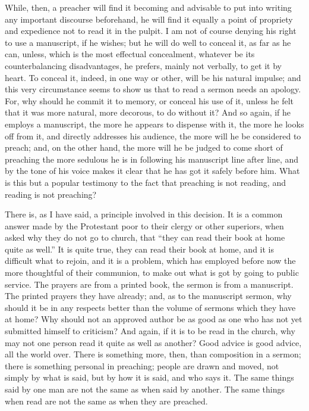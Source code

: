 While, then, a preacher will find it becoming and advisable to put
into writing any important discourse beforehand, he will find it
equally a point of propriety and expedience not to read it in the
pulpit. I am not of course denying his right to use a manuscript, if
he wishes; but he will do well to conceal it, as far as he can,
unless, which is the most effectual concealment, whatever be its
counterbalancing disadvantages, he prefers, mainly not verbally, to
get it by heart. To conceal it, indeed, in one way or other, will be
his natural impulse; and this very circumstance seems to show us that
to read a sermon needs an apology. For, why should he commit it to
memory, or conceal his use of it, unless he felt that it was more
natural, more decorous, to do without it? And so again, if he employs
a manuscript, the more he appears to dispense with it, the more he
looks off from it, and directly addresses his audience, the more will
he be considered to preach; and, on the other hand, the more will he
be judged to come short of preaching the more sedulous he is in
following his manuscript line after line, and by the tone of his voice
makes it clear that he has got it safely before him. What is this but
a popular testimony to the fact that preaching is not reading, and
reading is not preaching?

There is, as I have said, a principle involved in this decision. It
is a common answer made by the Protestant poor to their clergy or
other superiors, when asked why they do not go to church, that
``they can read their book at home quite as well.'' It is
quite true, they can read their book at home, and it is difficult what
to rejoin, and it is a problem, which has employed before now the more
thoughtful of their communion, to make out what is got by going to
public service. The prayers are from a printed book, the sermon is
from a manuscript. The printed prayers they have already; and, as to
the manuscript sermon, why should it be in any respects better than
the volume of sermons which they have at home? Why should not an
approved author be as good as one who has not yet submitted himself to
criticism? And again, if it is to be read in the church, why may not
one person read it quite as well as another? Good advice is good
advice, all the world over. There is something more, then, than
composition in a sermon; there is something personal in preaching;
people are drawn and moved, not simply by what is said, but by how it
is said, and who says it. The same things said by one man are not the
same as when said by another. The same things when read are not the
same as when they are preached.

